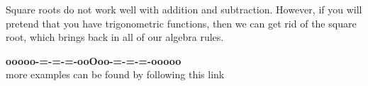 \documentclass{ximera}
\begin{document}
Square roots do not work well with addition and subtraction.  However, if you will pretend that you have trigonometric functions, then we can get rid of the square root, which brings back in all of our algebra rules.
























\begin{center}
\textbf{\textcolor{green!50!black}{ooooo-=-=-=-ooOoo-=-=-=-ooooo}} \\

more examples can be found by following this link\\ 

\end{center}
\end{document}
